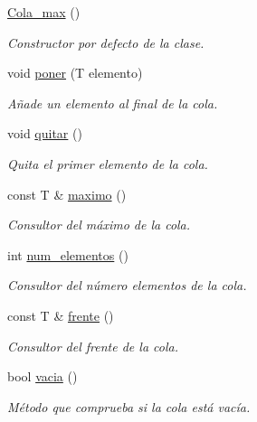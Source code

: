 \begin{DoxyCompactItemize}
\item 
\mbox{\label{classCola__max_af9a05d272cd9447f8ac449e8703c8ecb}} 
\hyperlink{classCola__max_af9a05d272cd9447f8ac449e8703c8ecb}{Cola\+\_\+max} ()
\begin{DoxyCompactList}\small\item\em Constructor por defecto de la clase. \end{DoxyCompactList}\item 
void \hyperlink{classCola__max_aaba30a35b89d26659408198baccee5aa}{poner} (T elemento)
\begin{DoxyCompactList}\small\item\em Añade un elemento al final de la cola. \end{DoxyCompactList}\item 
\mbox{\label{classCola__max_a21f1d915c674522d438f8288177e7ecb}} 
void \hyperlink{classCola__max_a21f1d915c674522d438f8288177e7ecb}{quitar} ()
\begin{DoxyCompactList}\small\item\em Quita el primer elemento de la cola. \end{DoxyCompactList}\item 
const T \& \hyperlink{classCola__max_ae1a93314e01ae1587b0e14fd768da476}{maximo} ()
\begin{DoxyCompactList}\small\item\em Consultor del máximo de la cola. \end{DoxyCompactList}\item 
int \hyperlink{classCola__max_adb26d0a523133af1f48dca6febebf72e}{num\+\_\+elementos} ()
\begin{DoxyCompactList}\small\item\em Consultor del número elementos de la cola. \end{DoxyCompactList}\item 
const T \& \hyperlink{classCola__max_a231de7f196376d7f27905b235a45db98}{frente} ()
\begin{DoxyCompactList}\small\item\em Consultor del frente de la cola. \end{DoxyCompactList}\item 
bool \hyperlink{classCola__max_af0b18f86af91ef94d7a035f87a4dcb2b}{vacia} ()
\begin{DoxyCompactList}\small\item\em Método que comprueba si la cola está vacía. \end{DoxyCompactList}\item 

\end{DoxyCompactItemize}
